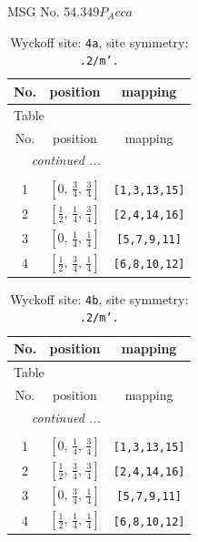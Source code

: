 \documentclass[fleqn,8pt]{jsarticle}
\begin{document}
\setcounter{MaxMatrixCols}{32}

\renewcommand{\tablename}{Table~}
\renewcommand{\figurename}{Figure~}
\begin{center}
\LARGE
MSG No. 54.349\quad$P_{A}cca$
\end{center}
\renewcommand{\arraystretch}{1.2}
\begin{longtable}{ccc}
\caption{Wyckoff site: {\tt 4a}, site symmetry: {\tt .2/m'.}}
 \\
 \hline \hline
No. & position & mapping \\ \hline \endfirsthead

\multicolumn{2}{l}{\tablename\ \thetable{}} \\
 \hline \hline
No. & position & mapping \\ \hline \endhead

 \hline \hline
\multicolumn{2}{r}{\footnotesize\it continued ...} \\ \endfoot

 \hline \hline
\multicolumn{2}{r}{} \\ \endlastfoot

1 & $\left[ 0,\, \frac{3}{4},\, \frac{3}{4} \right]$ & {\tt [1,3,13,15]} \\ \hline
2 & $\left[ \frac{1}{2},\, \frac{1}{4},\, \frac{3}{4} \right]$ & {\tt [2,4,14,16]} \\ \hline
3 & $\left[ 0,\, \frac{1}{4},\, \frac{1}{4} \right]$ & {\tt [5,7,9,11]} \\ \hline
4 & $\left[ \frac{1}{2},\, \frac{3}{4},\, \frac{1}{4} \right]$ & {\tt [6,8,10,12]} \\
\end{longtable}
\renewcommand{\arraystretch}{1.2}
\begin{longtable}{ccc}
\caption{Wyckoff site: {\tt 4b}, site symmetry: {\tt .2/m'.}}
 \\
 \hline \hline
No. & position & mapping \\ \hline \endfirsthead

\multicolumn{2}{l}{\tablename\ \thetable{}} \\
 \hline \hline
No. & position & mapping \\ \hline \endhead

 \hline \hline
\multicolumn{2}{r}{\footnotesize\it continued ...} \\ \endfoot

 \hline \hline
\multicolumn{2}{r}{} \\ \endlastfoot

1 & $\left[ 0,\, \frac{1}{4},\, \frac{3}{4} \right]$ & {\tt [1,3,13,15]} \\ \hline
2 & $\left[ \frac{1}{2},\, \frac{3}{4},\, \frac{3}{4} \right]$ & {\tt [2,4,14,16]} \\ \hline
3 & $\left[ 0,\, \frac{3}{4},\, \frac{1}{4} \right]$ & {\tt [5,7,9,11]} \\ \hline
4 & $\left[ \frac{1}{2},\, \frac{1}{4},\, \frac{1}{4} \right]$ & {\tt [6,8,10,12]} \\
\end{longtable}
\end{document}
